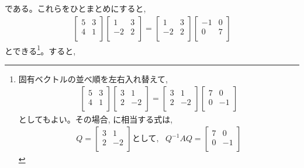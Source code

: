 である。これらをひとまとめにすると, 
\begin{eqnarray*}
\begin{bmatrix}
5 & 3 \\
4 & 1 \\
\end{bmatrix}
\begin{bmatrix}
1 & 3\\
-2 & 2\\
\end{bmatrix}
=\begin{bmatrix}
1 & 3\\
-2 & 2\\
\end{bmatrix}
\begin{bmatrix}
-1 & 0 \\
0 & 7 \\
\end{bmatrix}
\end{eqnarray*}
とできる\footnote{固有ベクトルの並べ順を左右入れ替えて, 
\begin{eqnarray*}
\begin{bmatrix}
5 & 3 \\
4 & 1 \\
\end{bmatrix}
\begin{bmatrix}
3 & 1\\
2 & -2\\
\end{bmatrix}
=\begin{bmatrix}
3 & 1\\
2 & -2\\
\end{bmatrix}
\begin{bmatrix}
7 & 0 \\
0 & -1 \\
\end{bmatrix}
\end{eqnarray*}
としてもよい。その場合, に相当する式は, 
\begin{eqnarray*}
Q=\begin{bmatrix}
3 & 1\\
2 & -2\\
\end{bmatrix}
\text{として, }\,\,\,
Q^{-1}AQ
=\begin{bmatrix}
7 & 0 \\
0 & -1 \\
\end{bmatrix}
\end{eqnarray*}
}。すると, 
